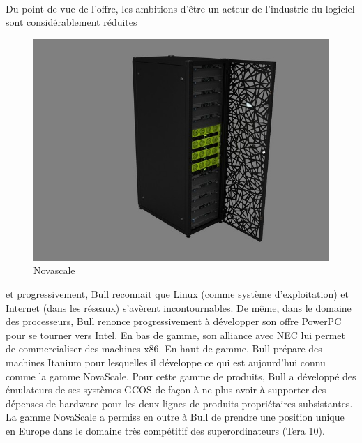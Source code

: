\documentclass{article}
\begin{document}
		\paragraph{}
		Du point de vue de l'offre, les ambitions d'être un acteur de l'industrie du logiciel sont considérablement réduites 
		\begin{figure}
		\includegraphics[scale=1]{novascale.jpg}
		\caption{Novascale}
		\end{figure} 
		et progressivement, Bull reconnait que Linux (comme système d'exploitation) et Internet (dans les réseaux) s'avèrent 
		incontournables. De même, dans le domaine des processeurs, Bull renonce progressivement à développer son offre PowerPC 
		pour se tourner vers Intel.\newline{}
		En bas de gamme, son alliance avec NEC lui permet de commercialiser des machines x86. En haut de gamme, Bull prépare 
		des machines Itanium pour lesquelles il développe ce qui est aujourd'hui connu comme la gamme NovaScale.\newline{}
		Pour cette gamme de produits, Bull a développé des émulateurs de ses systèmes GCOS de façon à ne plus avoir à 
		supporter des dépenses de hardware pour les deux lignes de produits propriétaires subsistantes.\newline{}
		\newline{}
		\newline{}
		\newline{}
		La gamme NovaScale a permiss en outre à Bull de prendre une position unique en Europe dans le domaine très compétitif 
		des superordinateurs (Tera 10).
\end{document}
